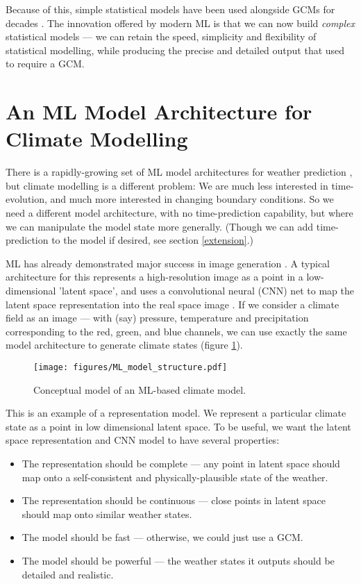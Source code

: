 \documentclass[gmd,manuscript]{copernicus}
\begin{document}
Because of this, simple statistical models have been used alongside GCMs for decades \citep{MAGICC}. The innovation offered by modern ML is that we can now build {\it complex} statistical models --- we can retain the speed, simplicity and flexibility of statistical modelling, while producing the precise and detailed output that used to require a GCM.

\section{An ML Model Architecture for Climate Modelling}

There is a rapidly-growing set of ML model architectures for weather prediction \citep{keisler2022forecasting,bi2022panguweather,nguyen2023climax}, but climate modelling is a different problem: We are much less interested in time-evolution, and much more interested in changing boundary conditions. So we need a different model architecture, with no time-prediction capability, but where we can manipulate the model state more generally. (Though we can add time-prediction to the model if desired, see section \ref{extension}.)

ML has already demonstrated major success in image generation \citep{StyleGAN2,Stable_Diffusion}. A typical architecture for this represents a high-resolution image as a point in a low-dimensional 'latent space', and uses a convolutional neural (CNN) net to map the latent space representation into the real space image \citep{StyleGAN}. If we consider a climate field as an image --- with (say) pressure, temperature and precipitation corresponding to the red, green, and blue channels, we can use exactly the same model architecture to generate climate states (figure \ref{ML_model_structure}).

\begin{figure}[h]
\texttt{[image: figures/ML\_model\_structure.pdf]}
\caption{Conceptual model of an ML-based climate model.}
\label{ML_model_structure}
\end{figure}

This is an example of a representation model. We represent a particular climate state as a point in low dimensional latent space. To be useful, we want the latent space representation and CNN model to have several properties:
\begin{itemize}
    \item The representation should be complete --- any point in latent space should map onto a self-consistent and physically-plausible state of the weather.
    \item The representation should be continuous --- close points in latent space should map onto similar weather states.
    \item The model should be fast --- otherwise, we could just use a GCM.
    \item The model should be powerful --- the weather states it outputs should be detailed and realistic.
\end{itemize}
\end{document}
